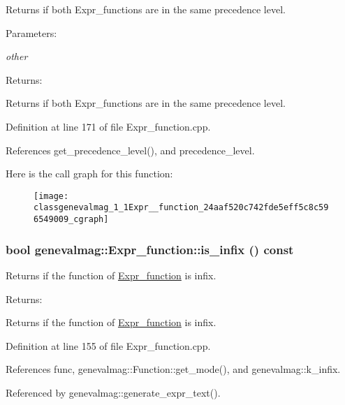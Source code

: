 Returns if both Expr\_\-functions are in the same precedence level. \begin{Desc}
\item[Parameters:]
\begin{description}
\item[{\em other}]\end{description}
\end{Desc}
\begin{Desc}
\item[Returns:]\end{Desc}
Returns if both Expr\_\-functions are in the same precedence level. 

Definition at line 171 of file Expr\_\-function.cpp.

References get\_\-precedence\_\-level(), and precedence\_\-level.

Here is the call graph for this function:\nopagebreak
\begin{figure}[H]
\begin{center}
\leavevmode
\texttt{[image: classgenevalmag\_1\_1Expr\_\_function\_24aaf520c742fde5eff5c8c596549009\_cgraph]}
\end{center}
\end{figure}
\hypertarget{classgenevalmag_1_1Expr__function_f5a16ffe850f268df142c625205961dc}{
\subsubsection[{is\_\-infix}]{\setlength{\rightskip}{0pt plus 5cm}bool genevalmag::Expr\_\-function::is\_\-infix () const}}
\label{classgenevalmag_1_1Expr__function_f5a16ffe850f268df142c625205961dc}


Returns if the function of \hyperlink{classgenevalmag_1_1Expr__function}{Expr\_\-function} is infix. \begin{Desc}
\item[Returns:]\end{Desc}
Returns if the function of \hyperlink{classgenevalmag_1_1Expr__function}{Expr\_\-function} is infix. 

Definition at line 155 of file Expr\_\-function.cpp.

References func, genevalmag::Function::get\_\-mode(), and genevalmag::k\_\-infix.

Referenced by genevalmag::generate\_\-expr\_\-text().

